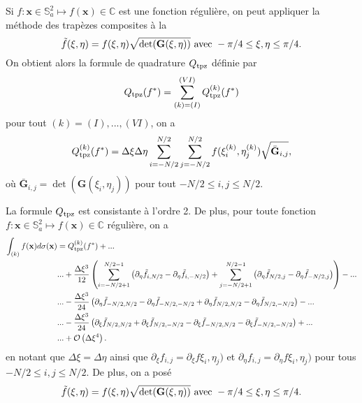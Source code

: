 Si $f : \mathbf{x} \in \mathbb{S}_a^2 \mapsto f(\mathbf{x}) \in \mathbb{C}$ est une fonction régulière, on peut appliquer la méthode des trapèzes composites à la
\begin{equation}
\tilde{f}(\xi,\eta) = f(\xi,\eta) \sqrt{\det(\mathbf{G}(\xi,\eta))} \text{ avec } -\pi/4 \leq \xi,\eta \leq \pi/4.
\end{equation}
On obtient alors la formule de quadrature $Q_{\text{tpz}}$ définie par
\begin{equation}
Q_{\text{tpz}}(f^*) = \displaystyle\sum\limits_{(k) = (I)}^{(VI)}Q_{\text{tpz}}^{(k)}(f^*)
\end{equation}
pour tout $(k) = (I), ..., (VI)$, on a
\begin{equation}
Q_{\text{tpz}}^{(k)}(f^*) = \Delta \xi \Delta \eta \displaystyle\sum\limits_{i=-N/2}^{N/2} \displaystyle\sum\limits_{j=-N/2}^{N/2} f(\xi_i^{(k)},\eta_j^{(k)}) \sqrt{\bar{\mathbf{G}}_{i,j}},
\end{equation}
où $\bar{\mathbf{G}}_{i,j}=\det(\mathbf{G}(\xi_i,\eta_j))$ pour tout $-N/2 \leq i,j \leq N/2$.

\begin{theoreme}
La formule $Q_{\text{tpz}}$ est consistante à l'ordre 2. De plus, pour toute fonction $f : \mathbf{x} \in \mathbb{S}_a^2 \mapsto f(\mathbf{x}) \in \mathbb{C}$ régulière, on a
\begin{align*}
\displaystyle\int_{(k)} f(\mathbf{x})d\sigma(\mathbf{x}) & = Q_{\text{tpz}}^{(k)}(f^*) + ... \\
& ... + \dfrac{\Delta \xi^3}{12} \left( \displaystyle\sum\limits_{i=-N/2+1}^{N/2-1} \left( \partial_{\eta}\tilde{f}_{i, N/2} - \partial_{\eta}\tilde{f}_{i, -N/2} \right) + \displaystyle\sum\limits_{j=-N/2+1}^{N/2-1} \left( \partial_{\eta}\tilde{f}_{N/2,j} - \partial_{\eta}\tilde{f}_{-N/2,j} \right) \right) - ...  \\
	&  ... - \dfrac{\Delta \xi^3}{24} \left( \partial_{\eta}\tilde{f}_{-N/2,N/2} - \partial_{\eta}\tilde{f}_{-N/2,-N/2} + \partial_{\eta}\tilde{f}_{N/2,N/2}  - \partial_{\eta}\tilde{f}_{N/2,-N/2} \right) - ...  \\
& ... - \dfrac{\Delta \xi^3}{24} \left( \partial_{\xi}\tilde{f}_{N/2,N/2} + \partial_{\xi}\tilde{f}_{N/2,-N/2} - \partial_{\xi}\tilde{f}_{-N/2,N/2}  - \partial_{\xi}\tilde{f}_{-N/2,-N/2} \right)+...\\
& ... + \mathcal{O} \left( \Delta \xi^4 \right).
\end{align*}
en notant que $\Delta \xi = \Delta \eta$ ainsi que $\partial _{\xi} f_{i,j} = \partial_{\xi}f\xi_i, \eta_j)$ et $\partial _{\eta} f_{i,j} = \partial_{\eta}f\xi_i, \eta_j)$ pour tous $-N/2 \leq i,j \leq N/2$.
De plus, on a posé 
\begin{equation}
\tilde{f}(\xi,\eta) = f(\xi,\eta) \sqrt{\det(\mathbf{G}(\xi,\eta))} \text{ avec } -\pi/4 \leq \xi,\eta \leq \pi/4.
\end{equation}
\label{th:quadrature_tpz}
\end{theoreme}

